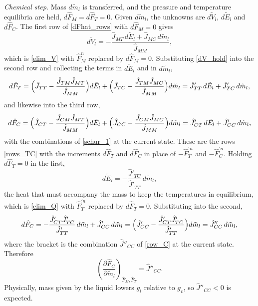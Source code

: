 \emph{Chemical step.} Mass $d\tilde{m}_l$ is transferred, and the pressure and temperature equilibria are held, $d\hat{F}_M=d\hat{F}_T=0$. Given $d\tilde{m}_l$, the unknowns are $d\tilde{V}_l$, $d\tilde{E}_l$ and $d\hat{F}_C$. The first row of \eqref{dFhat_rows} with $d\hat{F}_M=0$ gives
\begin{equation}\label{dV_hold}
d\tilde{V}_l=-\frac{\hat{J}_{MT}\,d\tilde{E}_l+\hat{J}_{MC}\,d\tilde{m}_l}{\hat{J}_{MM}},
\end{equation}
which is \eqref{elim_V} with $\hat{F}_M^n$ replaced by $d\hat{F}_M=0$. Substituting \eqref{dV_hold} into the second row and collecting the terms in $d\tilde{E}_l$ and in $d\tilde{m}_l$,
\begin{equation}
d\hat{F}_T=\Bigl(\hat{J}_{TT}-\frac{\hat{J}_{TM}\hat{J}_{MT}}{\hat{J}_{MM}}\Bigr)d\tilde{E}_l+\Bigl(\hat{J}_{TC}-\frac{\hat{J}_{TM}\hat{J}_{MC}}{\hat{J}_{MM}}\Bigr)d\tilde{m}_l=\hat{J}'_{TT}\,d\tilde{E}_l+\hat{J}'_{TC}\,d\tilde{m}_l,
\end{equation}
and likewise into the third row,
\begin{equation}
d\hat{F}_C=\Bigl(\hat{J}_{CT}-\frac{\hat{J}_{CM}\hat{J}_{MT}}{\hat{J}_{MM}}\Bigr)d\tilde{E}_l+\Bigl(\hat{J}_{CC}-\frac{\hat{J}_{CM}\hat{J}_{MC}}{\hat{J}_{MM}}\Bigr)d\tilde{m}_l=\hat{J}'_{CT}\,d\tilde{E}_l+\hat{J}'_{CC}\,d\tilde{m}_l,
\end{equation}
with the combinations of \eqref{schur_1} at the current state. These are the rows \eqref{rows_TC} with the increments $d\hat{F}_T$ and $d\hat{F}_C$ in place of $-\hat{F}^{\prime n}_T$ and $-\hat{F}^{\prime n}_C$. Holding $d\hat{F}_T=0$ in the first,
\begin{equation}
d\tilde{E}_l=-\frac{\hat{J}'_{TC}}{\hat{J}'_{TT}}\,d\tilde{m}_l,
\end{equation}
the heat that must accompany the mass to keep the temperatures in equilibrium, which is \eqref{elim_Q} with $\hat{F}^{\prime n}_T$ replaced by $d\hat{F}_T=0$. Substituting into the second,
\begin{equation}
d\hat{F}_C=-\frac{\hat{J}'_{CT}\hat{J}'_{TC}}{\hat{J}'_{TT}}\,d\tilde{m}_l+\hat{J}'_{CC}\,d\tilde{m}_l=\Bigl(\hat{J}'_{CC}-\frac{\hat{J}'_{CT}\hat{J}'_{TC}}{\hat{J}'_{TT}}\Bigr)d\tilde{m}_l=\hat{J}''_{CC}\,d\tilde{m}_l,
\end{equation}
where the bracket is the combination $\hat{J}''_{CC}$ of \eqref{row_C} at the current state. Therefore
\begin{equation}
\left(\frac{\partial \hat{F}_C}{\partial\tilde{m}_l}\right)_{\hat{F}_M,\hat{F}_T}=\hat{J}''_{CC}.
\end{equation}
Physically, mass given by the liquid lowers $g_l$ relative to $g_v$, so $\hat{J}''_{CC}<0$ is expected.

